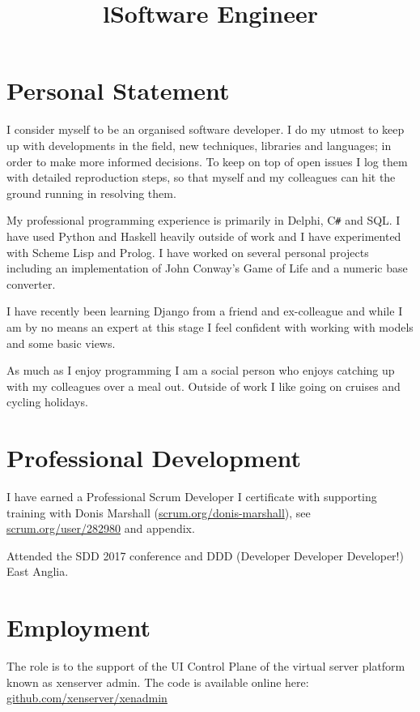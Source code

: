 \documentclass[line,margin]{res}
\title{l} \location{r} \\
\newcommand{\CSharp}{C\texttt{\#}}
\begin{document}
\begin{resume}

\section{Personal Statement}
I consider myself to be an organised software developer.
I do my utmost to keep up with developments in the field, new techniques, libraries and languages; in order to make more informed decisions.
To keep on top of open issues I log them with detailed reproduction steps, so that myself and my colleagues can hit the ground running in resolving them.

My professional programming experience is primarily in Delphi, {\CSharp} and SQL. I have used Python and Haskell heavily outside of work and I have experimented with Scheme Lisp and Prolog.
I have worked on several personal projects including an implementation of John Conway's Game of Life and a numeric base converter.

I have recently been learning Django from a friend and ex-colleague and while I am by no means an expert at this stage I feel confident with working with models and some basic views.

As much as I enjoy programming I am a social person who enjoys catching up with my colleagues over a meal out.
Outside of work I like going on cruises and cycling holidays.

\section{Professional Development}
I have earned a Professional Scrum Developer I certificate with supporting training with Donis Marshall (\href{https://www.scrum.org/donis-marshall}{scrum.org/donis-marshall}), see \href{https://www.scrum.org/user/282980}{scrum.org/user/282980} and appendix.

Attended the SDD 2017 conference and
DDD (Developer Developer Developer!) East Anglia.

\section{Employment}

\title{Software Engineer}
\begin{position}
The role is to the support of the UI Control Plane
of the virtual server platform known as xenserver admin.
The code is available online here:
\href{https://github.com/xenserver/xenadmin}{github.com/xenserver/xenadmin}
\end{position}


\end{resume}
\end{document}
